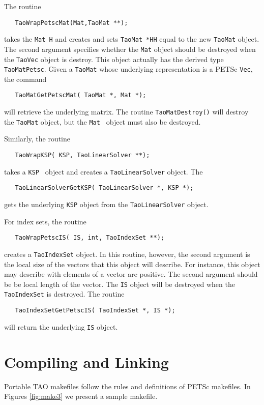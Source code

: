 The routine 
\begin{verbatim}
   TaoWrapPetscMat(Mat,TaoMat **); 
\end{verbatim}
\noindent
takes the {\tt Mat H} and creates and sets {\tt TaoMat *HH} equal to
the new {\tt TaoMat} object.   The second argument specifies whether
the {\tt Mat} object should be destroyed when the {\tt TaoVec} object
is destroy.
This object actually has the derived
type {\tt TaoMatPetsc}.
Given a {\tt TaoMat} whose underlying representation is a PETSc {\tt Vec},
the command
\begin{verbatim}
   TaoMatGetPetscMat( TaoMat *, Mat *);
\end{verbatim}
\noindent
will retrieve the underlying matrix.
The routine {\tt TaoMatDestroy()} will destroy the {\tt TaoMat} object,
but the {\tt Mat } object must also be destroyed.

Similarly, the routine 
\begin{verbatim}
   TaoWrapKSP( KSP, TaoLinearSolver **);
\end{verbatim}
\noindent
takes a {\tt KSP } object and creates a  {\tt TaoLinearSolver}
object.  The 
\begin{verbatim}
   TaoLinearSolverGetKSP( TaoLinearSolver *, KSP *);
\end{verbatim}
\noindent
gets the underlying {\tt KSP} object from the {\tt TaoLinearSolver}
object.


For index sets, the routine
\begin{verbatim}
   TaoWrapPetscIS( IS, int, TaoIndexSet **);
\end{verbatim}
\noindent
creates a {\tt TaoIndexSet} object.  In this routine, however, the
second argument is the local size of the vectors that this object
will describe.  For instance, this object may describe with
elements of a vector are positive.  The second argument should
be be local length of the vector.  The {\tt IS} object will
be destroyed when the {\tt TaoIndexSet} is destroyed.  The routine
\begin{verbatim}
   TaoIndexSetGetPetscIS( TaoIndexSet *, IS *);
\end{verbatim}
\noindent
will return the underlying {\tt IS} object.


\section{Compiling and Linking}

Portable TAO makefiles follow the rules and definitions
of PETSc makefiles.
In Figures \ref{fig:make3} we present a sample makefile.

